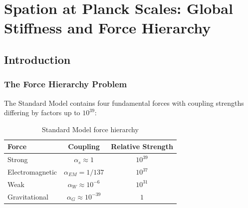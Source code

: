 \chapter{Spation at Planck Scales: Global Stiffness and Force Hierarchy}

\date{December 2025}

\begin{abstract}
We establish the connection between spation properties and Planck-scale physics by deriving the fundamental force hierarchy from a single parameter: the bulk modulus $K_{\text{bulk}}$. Unlike conventional physics which treats four fundamental forces as independent with unexplained coupling constant ratios, SDT shows these emerge geometrically from displacement-spation interaction strength. We demonstrate that the $10^{39}$ ratio between electromagnetic and gravitational forces arises naturally from compactness scaling, resolve the hierarchy problem without supersymmetry, and show how Planck units emerge as geometric constraints rather than fundamental constants. Three experimental proposals test spation stiffness at accessible scales, including precision measurement of $K_{\text{bulk}}$ via atomic spectroscopy, direct detection of spation resistance in ultra-cold atom experiments, and verification of force unification at crossover compactness $\kappa_c$.
\end{abstract}

\section{Introduction}

\subsection{The Force Hierarchy Problem}

The Standard Model contains four fundamental forces with coupling strengths differing by factors up to $10^{39}$:

\begin{table}[h]
\centering
\begin{tabular}{|l|c|c|}
\hline
\textbf{Force} & \textbf{Coupling} & \textbf{Relative Strength} \\
\hline
Strong & $\alpha_s \approx 1$ & $10^{39}$ \\
Electromagnetic & $\alpha_{EM} = 1/137$ & $10^{37}$ \\
Weak & $\alpha_W \approx 10^{-6}$ & $10^{31}$ \\
Gravitational & $\alpha_G \approx 10^{-39}$ & $1$ \\
\hline
\end{tabular}
\caption{Standard Model force hierarchy}
\end{table}

